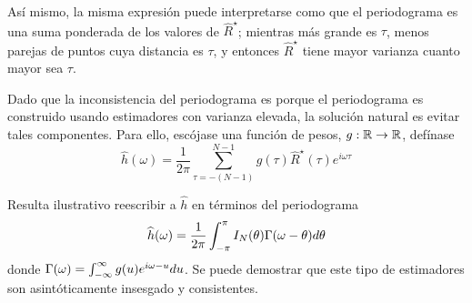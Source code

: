 Así mismo, la misma expresión puede interpretarse como que el periodograma es una suma ponderada de 
los valores de $\widehat{R}^{\star}$; mientras más grande es $\tau$, menos parejas de puntos cuya 
distancia es $\tau$, y entonces $\widehat{R}^{\star}$ tiene mayor varianza cuanto mayor sea $\tau$. 

Dado que la inconsistencia del periodograma es porque el periodograma es construido usando 
estimadores con varianza elevada, la solución natural es evitar tales componentes. Para ello, 
escójase una función de pesos, $g: \mathbb{R} \rightarrow \mathbb{R}$, defínase
%
\begin{equation}
\widehat{h}(\omega) = \frac{1}{2 \pi} \sum_{\tau = -(N-1)}^{N-1} g(\tau) \widehat{R}^{\star}(\tau) 
e^{i \omega \tau} 
\label{txt_estimador}
\end{equation}

Resulta ilustrativo reescribir a $\widehat{h}$ en términos del periodograma
\begin{equation*}
\widehat{h}(\omega) = \frac{1}{2 \pi} \int_{-\pi}^{\pi} I_N(\theta) \Gamma(\omega - \theta) d\theta
\end{equation*}
donde $\Gamma(\omega) = \int_{-\infty}^{\infty} g(u) e^{i \omega -u } du$.
%
Se puede demostrar que este tipo de estimadores son asintóticamente insesgado y consistentes.


